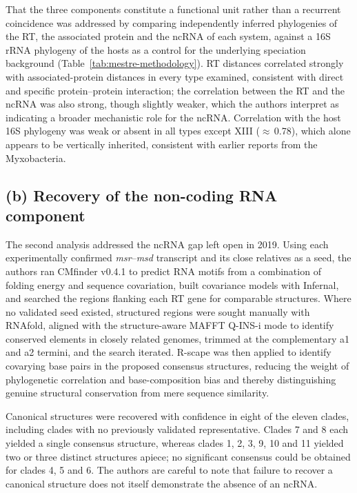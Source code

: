 That the three components constitute a functional unit rather than a recurrent coincidence was
addressed by comparing independently inferred phylogenies of the RT, the associated protein and
the ncRNA of each system, against a 16S rRNA phylogeny of the hosts as a control for the
underlying speciation background (Table~\ref{tab:mestre-methodology}). RT distances correlated
strongly with associated-protein distances in every type examined, consistent with direct and
specific protein--protein interaction; the correlation between the RT and the ncRNA was also
strong, though slightly weaker, which the authors interpret as indicating a broader mechanistic
role for the ncRNA. Correlation with the host 16S phylogeny was weak or absent in all types except
XIII ($\approx$\,0.78), which alone appears to be vertically inherited, consistent with earlier
reports from the Myxobacteria.

\subsection{(b) Recovery of the non-coding RNA component}
 
The second analysis addressed the ncRNA gap left open in 2019. Using each experimentally confirmed
\textit{msr}--\textit{msd} transcript and its close relatives as a seed, the authors ran CMfinder
v0.4.1 to predict RNA motifs from a combination of folding energy and sequence covariation, built
covariance models with Infernal, and searched the regions flanking each RT gene for comparable
structures. Where no validated seed existed, structured regions were sought manually with RNAfold,
aligned with the structure-aware MAFFT Q-INS-i mode to identify conserved elements in closely
related genomes, trimmed at the complementary a1 and a2 termini, and the search iterated. R-scape
was then applied to identify covarying base pairs in the proposed consensus structures, reducing
the weight of phylogenetic correlation and base-composition bias and thereby distinguishing
genuine structural conservation from mere sequence similarity.
 
Canonical structures were recovered with confidence in eight of the eleven clades, including
clades with no previously validated representative. Clades 7 and 8 each yielded a single consensus
structure, whereas clades 1, 2, 3, 9, 10 and 11 yielded two or three distinct structures apiece;
no significant consensus could be obtained for clades 4, 5 and 6. The authors are careful to note
that failure to recover a canonical structure does not itself demonstrate the absence of an ncRNA.


